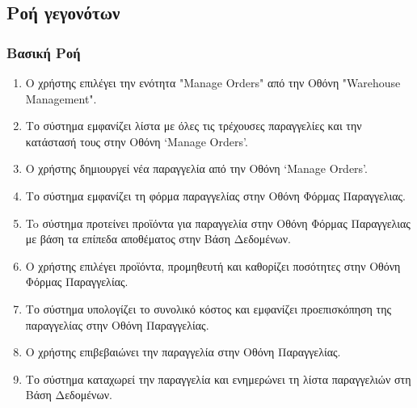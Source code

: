 \documentclass[12pt,a4paper,twoside]{book}
\begin{document}
\subsection{Ροή γεγονότων}

\subsubsection{Βασική Ροή}
\begin{enumerate}
  \item Ο χρήστης επιλέγει την ενότητα "Manage Orders" από την Οθόνη "Warehouse Management". %
  \item Το σύστημα εμφανίζει λίστα με όλες τις τρέχουσες παραγγελίες και την κατάστασή τους στην Οθόνη `Manage Orders'.
  \item Ο χρήστης δημιουργεί νέα παραγγελία από την Οθόνη `Manage Orders'. %
  \item Το σύστημα εμφανίζει τη φόρμα παραγγελίας στην Οθόνη Φόρμας Παραγγελιας.
  \item To σύστημα προτείνει προϊόντα για παραγγελία στην Οθόνη Φόρμας Παραγγελιας με βάση τα επίπεδα αποθέματος στην Βάση Δεδομένων. %
  \item Ο χρήστης επιλέγει προϊόντα, προμηθευτή και καθορίζει ποσότητες στην Οθόνη Φόρμας Παραγγελίας.
  \item Το σύστημα υπολογίζει το συνολικό κόστος και εμφανίζει προεπισκόπηση της παραγγελίας στην Οθόνη Παραγγελίας.
  \item Ο χρήστης επιβεβαιώνει την παραγγελία στην Οθόνη Παραγγελίας.
  \item Το σύστημα καταχωρεί την παραγγελία και ενημερώνει τη λίστα παραγγελιών στη Βάση Δεδομένων. %
\end{enumerate}
\end{document}
